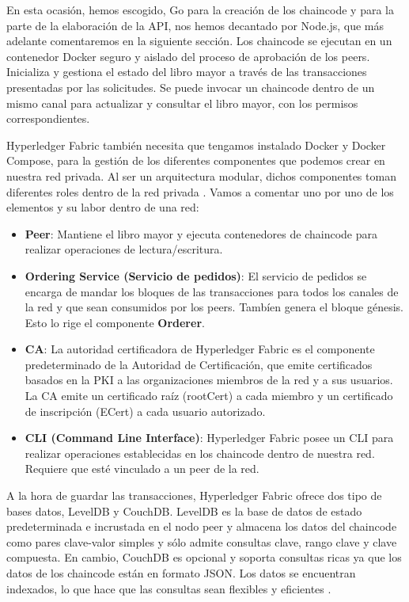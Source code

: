 \vspace{5mm}

\noindent En esta ocasión, hemos escogido, Go para la creación de los chaincode y para la parte de la elaboración
de la API, nos hemos decantado por Node.js, que más adelante comentaremos en la siguiente sección. Los chaincode 
se ejecutan en un contenedor Docker seguro y aislado del proceso de aprobación de los peers. Inicializa y gestiona 
el estado del libro mayor a través de las transacciones presentadas por las solicitudes. Se puede invocar un 
chaincode dentro de un mismo canal para actualizar y consultar el libro mayor, con los permisos correspondientes.

\vspace{5mm}

\noindent Hyperledger Fabric también necesita que tengamos instalado Docker y Docker Compose, para la gestión de los 
diferentes componentes que podemos crear en nuestra red privada. Al ser un arquitectura modular, dichos componentes 
toman diferentes roles dentro de la red privada \cite{hyperledger-fabric-docs}. Vamos a comentar uno por uno de los 
elementos y su labor dentro de una red:

\begin{itemize}
    \item \textbf{Peer}: Mantiene el libro mayor y ejecuta contenedores de chaincode para realizar operaciones de 
    lectura/escritura.
    \item \textbf{Ordering Service (Servicio de pedidos)}: El servicio de pedidos se encarga de mandar los bloques de 
    las transacciones para todos los canales de la red y que sean consumidos por los peers. Tambíen genera el bloque 
    génesis. Esto lo rige el componente \textbf{Orderer}.
    \item \textbf{CA}: La autoridad certificadora de Hyperledger Fabric es el componente predeterminado de la 
    Autoridad de Certificación, que emite certificados basados en la PKI a las organizaciones miembros de la red y a 
    sus usuarios. La CA emite un certificado raíz (rootCert) a cada miembro y un certificado de inscripción (ECert) a 
    cada usuario autorizado.
    \item \textbf{CLI (Command Line Interface)}: Hyperledger Fabric posee un CLI para realizar operaciones establecidas 
    en los chaincode dentro de nuestra red. Requiere que esté vinculado a un peer de la red.
\end{itemize}

\noindent A la hora de guardar las transacciones, Hyperledger Fabric ofrece dos tipo de bases datos, LevelDB y CouchDB. 
LevelDB es la base de datos de estado predeterminada e incrustada en el nodo peer y almacena los datos del chaincode 
como pares clave-valor simples y sólo admite consultas clave, rango clave y clave compuesta. En cambio, CouchDB es 
opcional y soporta consultas ricas ya que los datos de los chaincode están en formato JSON. Los datos se encuentran 
indexados, lo que hace que las consultas sean flexibles y eficientes \cite{using-couchdb}.

